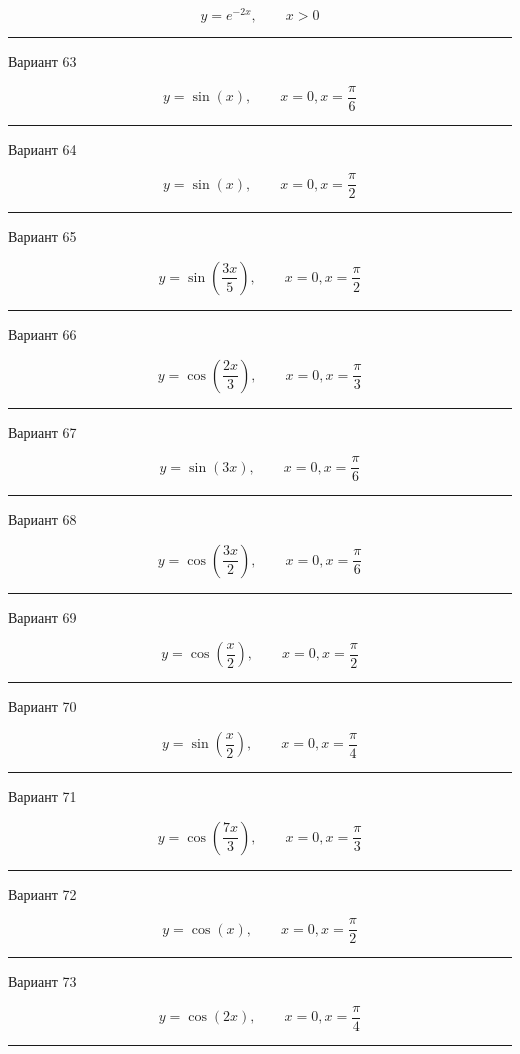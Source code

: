 \documentclass[11pt]{report}
\begin{document}
$$y=e^{- 2 x}, \qquad x > 0$$

\rule{\textwidth}{.2mm}

Вариант 63

$$y=\sin{\left(x \right)}, \qquad x = 0, x = \frac{\pi}{6}$$

\rule{\textwidth}{.2mm}

Вариант 64

$$y=\sin{\left(x \right)}, \qquad x = 0, x = \frac{\pi}{2}$$

\rule{\textwidth}{.2mm}

Вариант 65

$$y=\sin{\left(\frac{3 x}{5} \right)}, \qquad x = 0, x = \frac{\pi}{2}$$

\rule{\textwidth}{.2mm}

Вариант 66

$$y=\cos{\left(\frac{2 x}{3} \right)}, \qquad x = 0, x = \frac{\pi}{3}$$

\rule{\textwidth}{.2mm}

Вариант 67

$$y=\sin{\left(3 x \right)}, \qquad x = 0, x = \frac{\pi}{6}$$

\rule{\textwidth}{.2mm}

Вариант 68

$$y=\cos{\left(\frac{3 x}{2} \right)}, \qquad x = 0, x = \frac{\pi}{6}$$

\rule{\textwidth}{.2mm}

Вариант 69

$$y=\cos{\left(\frac{x}{2} \right)}, \qquad x = 0, x = \frac{\pi}{2}$$

\rule{\textwidth}{.2mm}

Вариант 70

$$y=\sin{\left(\frac{x}{2} \right)}, \qquad x = 0, x = \frac{\pi}{4}$$

\rule{\textwidth}{.2mm}

Вариант 71

$$y=\cos{\left(\frac{7 x}{3} \right)}, \qquad x = 0, x = \frac{\pi}{3}$$

\rule{\textwidth}{.2mm}

Вариант 72

$$y=\cos{\left(x \right)}, \qquad x = 0, x = \frac{\pi}{2}$$

\rule{\textwidth}{.2mm}

Вариант 73

$$y=\cos{\left(2 x \right)}, \qquad x = 0, x = \frac{\pi}{4}$$

\rule{\textwidth}{.2mm}
\end{document}
